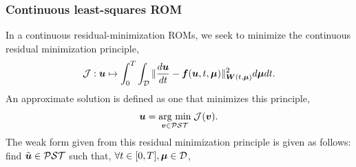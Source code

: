 \documentclass[3p,computermodern,10pt]{elsarticle}
\begin{document}
\subsubsection{Continuous least-squares ROM}
In a continuous residual-minimization ROMs, we seek to minimize the continuous residual minimization principle,
$$\mathcal{J} : \boldsymbol u \mapsto \int_{0}^T \int_{\mathcal{D}} \| \frac{d \boldsymbol u}{dt} - \boldsymbol f(\boldsymbol u,t,\boldsymbol \mu) \|_{\boldsymbol W(t,\boldsymbol \mu)}^2 d\boldsymbol \mu dt.$$
An approximate solution is defined as one that minimizes this principle, 
$$\boldsymbol u = \underset{ \boldsymbol v \in \mathcal{PST}}{\text{arg min}}\;\mathcal{J}(\boldsymbol v).$$
The weak form given from this residual minimization principle is given as follows: find $\tilde{\boldsymbol u} \in \mathcal{PST}$ such that, $\forall t \in [0,T], \boldsymbol \mu \in \mathcal{D}$,
\end{document}
